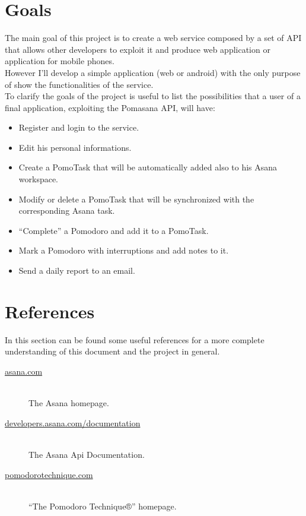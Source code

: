 	\section{Goals}
	\label{goals}
	The main goal of this project is to create a web service composed by a set of API that allows other developers to exploit it and produce web application or application for mobile phones.\\
	However I'll develop a simple application (web or android) with the only purpose of show the functionalities of the service.\\
	To clarify the goals of the project is useful to list the possibilities that a user of a final application, exploiting the Pomasana API, will have:

	\begin{itemize}

		\item Register and login to the service.

		\item Edit his personal informations.

		\item Create a PomoTask that will be automatically added also to his Asana workspace.

		\item Modify or delete a PomoTask that will be synchronized with the corresponding Asana task.

		\item ``Complete'' a Pomodoro and add it to a PomoTask.

		\item Mark a Pomodoro with interruptions and add notes to it.

		\item Send a daily report to an email.

	\end{itemize}



	\section{References}
	\label{references}
		In this section can be found some useful references for a more complete understanding of this document and the project in general.

		\begin{description}

		\item[\href{https://asana.com}{asana.com}] \hfill \\
		The Asana homepage.

		\item[\href{http://developers.asana.com/documentation/}{developers.asana.com/documentation}] \hfill \\
		The Asana Api Documentation.

		\item[\href{http://pomodorotechnique.com}{pomodorotechnique.com}] \hfill \\
		“The Pomodoro Technique®” homepage.

		\end{description}

